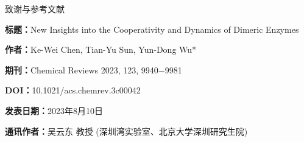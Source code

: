 \documentclass[aspectratio=169,11pt]{beamer}
\begin{document}
\begin{frame}{致谢与参考文献}
  \begin{iqbitemize}
    \item \textbf{标题：}New Insights into the Cooperativity and Dynamics of Dimeric Enzymes
    \item \textbf{作者：}Ke-Wei Chen, Tian-Yu Sun, Yun-Dong Wu*
    \item \textbf{期刊：}Chemical Reviews 2023, 123, 9940−9981
    \item \textbf{DOI：}10.1021/acs.chemrev.3c00042
    \item \textbf{发表日期：}2023年8月10日
    \item \textbf{通讯作者：}吴云东 教授 (深圳湾实验室、北京大学深圳研究生院)
  \end{iqbitemize}

  \iqbsep


\end{frame}
\end{document}
